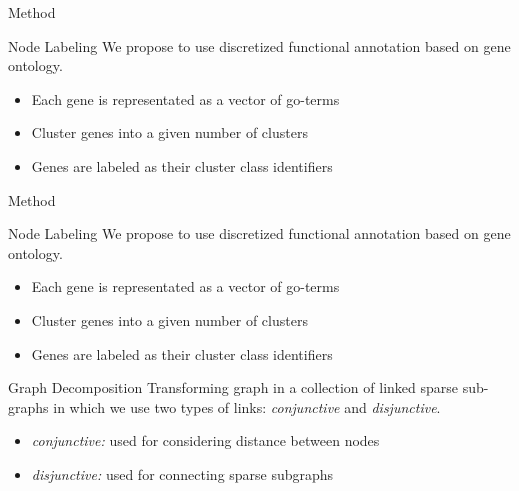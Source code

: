 \documentclass{beamer}
\begin{document}
\begin{frame}[t]{Method}
	\begin{block}{Node Labeling}
We propose to use discretized functional annotation based on gene ontology. \vspace{.3em}
\begin{itemize}
	\item Each gene is representated as a vector of go-terms \vspace{.2em}
	\item Cluster genes into a given number of clusters \vspace{.2em}
	\item Genes are labeled as their cluster class identifiers \vspace{.2em}
\end{itemize}		
	\end{block}
\end{frame}
\begin{frame}[t]{Method}
	\begin{block}{Node Labeling}
We propose to use discretized functional annotation based on gene ontology. \vspace{.2em}
\begin{itemize}
	\item Each gene is representated as a vector of go-terms \vspace{.2em}
	\item Cluster genes into a given number of clusters \vspace{.2em}
	\item Genes are labeled as their cluster class identifiers \vspace{.2em}
\end{itemize}		
	\end{block}
	\begin{block}{Graph Decomposition}
Transforming graph in a collection of linked sparse sub-graphs in which we use two types of links: \textit{conjunctive} and \textit{disjunctive}.
	\begin{itemize}
		\item \textit{conjunctive:} used for considering distance between nodes
		\item \textit{disjunctive:} used for connecting sparse subgraphs
	\end{itemize}
	\end{block}
\end{frame}
\end{document}
